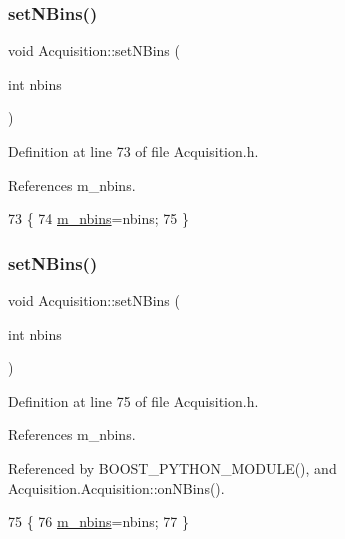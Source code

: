 \subsubsection{\texorpdfstring{set\+N\+Bins()}{setNBins()}\hspace{0.1cm}{\footnotesize\ttfamily [1/2]}}
{\footnotesize\ttfamily void Acquisition\+::set\+N\+Bins (\begin{DoxyParamCaption}\item[{int}]{nbins }\end{DoxyParamCaption})\hspace{0.3cm}{\ttfamily [inline]}}



Definition at line 73 of file Acquisition.\+h.



References m\+\_\+nbins.


\begin{DoxyCode}
73                           \{
74     \hyperlink{classAcquisition_a05bccdc4b9ada37beaeba8794ccef12d}{m\_nbins}=nbins;
75   \}
\end{DoxyCode}
\mbox{\label{classAcquisition_a6ee040a009aa48f848b1e12434135db9}} 
\subsubsection{\texorpdfstring{set\+N\+Bins()}{setNBins()}\hspace{0.1cm}{\footnotesize\ttfamily [2/2]}}
{\footnotesize\ttfamily void Acquisition\+::set\+N\+Bins (\begin{DoxyParamCaption}\item[{int}]{nbins }\end{DoxyParamCaption})\hspace{0.3cm}{\ttfamily [inline]}}



Definition at line 75 of file Acquisition.\+h.



References m\+\_\+nbins.



Referenced by B\+O\+O\+S\+T\+\_\+\+P\+Y\+T\+H\+O\+N\+\_\+\+M\+O\+D\+U\+L\+E(), and Acquisition.\+Acquisition\+::on\+N\+Bins().


\begin{DoxyCode}
75                           \{
76     \hyperlink{classAcquisition_a05bccdc4b9ada37beaeba8794ccef12d}{m\_nbins}=nbins;
77   \}
\end{DoxyCode}
\mbox{\label{classProcessus_a831b027b9cf18ab56fa6147b5d3055da}} 

